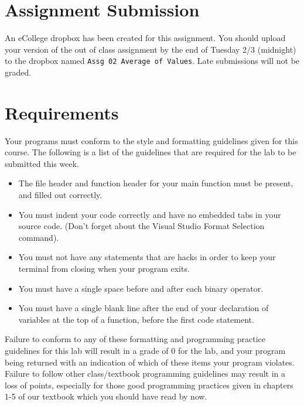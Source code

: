 \documentclass[11pt]{article}
\begin{document}
\section*{Assignment Submission}
\label{sec-4}


An eCollege dropbox has been created for this assignment.  You should
upload your version of the out of class assignment by the end of
Tuesday 2/3 (midnight) to the dropbox named \verb~Assg 02 Average of Values~.
Late submissions will not be graded.
\section*{Requirements}
\label{sec-5}

Your programs must conform to the style and formatting guidelines given for this course.
The following is a list of the guidelines that are required for the lab to be submitted
this week.

\begin{itemize}
\item The file header and function header for your main function must be present, and filled out correctly.
\item You must indent your code correctly and have no embedded tabs in your source code. (Don't forget about the Visual Studio Format Selection command).
\item You must not have any statements that are hacks in order to keep your terminal from closing when your program exits.
\item You must have a single space before and after each binary operator.
\item You must have a single blank line after the end of your declaration
  of variables at the top of a function, before the first code
  statement.
\end{itemize}

Failure to conform to any of these formatting and programming practice
guidelines for this lab will result in a grade of 0 for the lab, and
your program being returned with an indication of which of these items
your program violates.  Failure to follow other class/textbook
programming guidelines may result in a loss of points, especially for
those good programming practices given in chapters 1-5 of our textbook
which you should have read by now.
\end{document}
